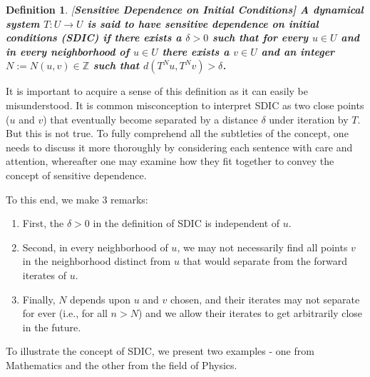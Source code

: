 \documentclass[a4paper,12pt,twoside]{report}
\newtheorem{Definition}{Definition}[]
\begin{document}
\begin{Definition}\rm
  [\bf {Sensitive Dependence on Initial Conditions}]\label{Dfn_SDIC}\rm
A dynamical system $T: U \to U$ is said to have sensitive dependence on initial conditions (SDIC) if there exists a $\delta > 0$ such that for every $u \in U$ and in every neighborhood of $u \in U$ there exists a $v\in{U}$ and an integer $N:=N{(u,v)}\in\mathbb{Z}$ such that $d(T^Nu,T^Nv)>\delta$. 	
\end{Definition}

It is important to acquire a sense of this definition as it can easily be misunderstood. It is common misconception to interpret SDIC as two close points ($u$ and $v$) that eventually become separated by a distance $\delta$ under iteration by $T$. But this is not true. To fully comprehend all the subtleties of the concept, one needs to discuss it more thoroughly by considering each sentence with care and attention, whereafter one may examine how they fit together to convey the concept of sensitive dependence. 

To this end, we make 3 remarks:
\vspace{-5mm}
\begin{enumerate}
  \item First, the $\delta>0$ in the definition of SDIC is independent of $u$. 
  \item Second, in every neighborhood of $u$, we may not necessarily find all points $v$ in the neighborhood distinct from $u$ that would separate from the forward iterates of $u$. 
  \item  Finally, $N$ depends upon $u$ and $v$ chosen, and their iterates may not separate for ever (i.e., for all $n>N$) and we allow their iterates to get arbitrarily close in the future. 
\end{enumerate}

To illustrate the concept of SDIC, we present two examples - one from Mathematics and the other from the field of Physics.
\end{document}
